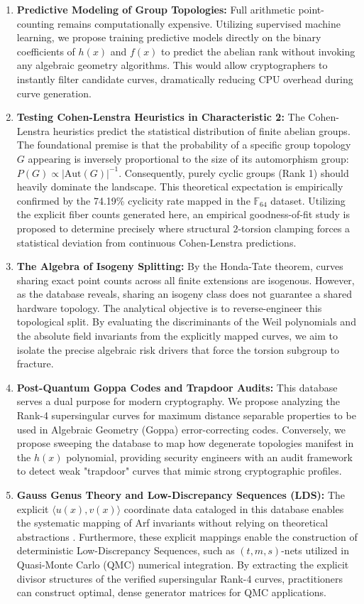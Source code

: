 \documentclass[11pt,letterpaper]{article}
\begin{document}
\begin{enumerate}
\item \textbf{Predictive Modeling of Group Topologies:} Full arithmetic point-counting remains computationally expensive. Utilizing supervised machine learning, we propose training predictive models directly on the binary coefficients of $h(x)$ and $f(x)$ to predict the abelian rank without invoking any algebraic geometry algorithms. This would allow cryptographers to instantly filter candidate curves, dramatically reducing CPU overhead during curve generation.
\item \textbf{Testing Cohen-Lenstra Heuristics in Characteristic 2:} The Cohen-Lenstra heuristics predict the statistical distribution of finite abelian groups. The foundational premise is that the probability of a specific group topology $G$ appearing is inversely proportional to the size of its automorphism group: $P(G) \propto |\text{Aut}(G)|^{-1}$. Consequently, purely cyclic groups (Rank 1) should heavily dominate the landscape. This theoretical expectation is empirically confirmed by the 74.19\% cyclicity rate mapped in the $\mathbb{F}_{64}$ dataset. Utilizing the explicit fiber counts generated here, an empirical goodness-of-fit study is proposed to determine precisely where structural $2$-torsion clamping forces a statistical deviation from continuous Cohen-Lenstra predictions.
\item \textbf{The Algebra of Isogeny Splitting:} By the Honda-Tate theorem, curves sharing exact point counts across all finite extensions are isogenous. However, as the database reveals, sharing an isogeny class does not guarantee a shared hardware topology. The analytical objective is to reverse-engineer this topological split. By evaluating the discriminants of the Weil polynomials and the absolute field invariants from the explicitly mapped curves, we aim to isolate the precise algebraic risk drivers that force the torsion subgroup to fracture.
\item \textbf{Post-Quantum Goppa Codes and Trapdoor Audits:} This database serves a dual purpose for modern cryptography. We propose analyzing the Rank-4 supersingular curves for maximum distance separable properties to be used in Algebraic Geometry (Goppa) error-correcting codes. Conversely, we propose sweeping the database to map how degenerate topologies manifest in the $h(x)$ polynomial, providing security engineers with an audit framework to detect weak "trapdoor" curves that mimic strong cryptographic profiles.
\item \textbf{Gauss Genus Theory and Low-Discrepancy Sequences (LDS):} The explicit $\langle u(x), v(x) \rangle$ coordinate data cataloged in this database enables the systematic mapping of Arf invariants without relying on theoretical abstractions \cite{Zhang2026}. Furthermore, these explicit mappings enable the construction of deterministic Low-Discrepancy Sequences, such as $(t, m, s)$-nets utilized in Quasi-Monte Carlo (QMC) numerical integration. By extracting the explicit divisor structures of the verified supersingular Rank-4 curves, practitioners can construct optimal, dense generator matrices for QMC applications.

\end{enumerate}
\end{document}
